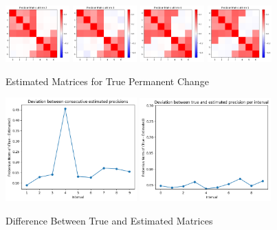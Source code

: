 \documentclass{article}
\begin{document}
\begin{figure}[h!]
    \centering
    \includegraphics[width=0.22\textwidth]{matrix1.png}
    \includegraphics[width=0.22\textwidth]{matrix2.png}
    \includegraphics[width=0.22\textwidth]{matrix3.png}
    \includegraphics[width=0.22\textwidth]{matrix4.png}
    \caption{Estimated Matrices for True Permanent Change}
\end{figure}
\newpage
\begin{figure}[h!]
    \centering
    \includegraphics[width=0.45\textwidth]{difference1.png}
    \includegraphics[width=0.45\textwidth]{difference2.png}
    \caption{Difference Between True and Estimated Matrices}
\end{figure}
\end{document}
